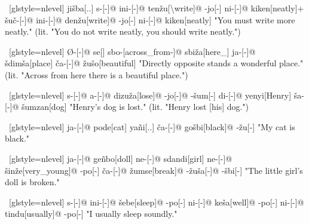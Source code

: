 \ex~[glstyle=nlevel]
\begingl
\glpreamble {}
\endpreamble
ji\v{s}ba[{\Spol}.{\Hg}.{\Erg}]
s-[{\Ind}-]@
ini-[{\Hab}-]@
ten\v{z}u[{\Neg}\textbackslash write]@
-jo[-\Hg]
ni-[{\Hab}-]@
kiken[neatly]+
\v{s}u\v{c}-[{\Deo}-]@
ini-[{\Hab}-]@
den\v{z}u[write]@
-jo[-\Hg]
ni-[{\Hab}-]@
kiken[neatly]
\glft "You must write more neatly." (lit. "You do not write neatly, you should write neatly.")
\endgl
\xe

\ex~[glstyle=nlevel]
\begingl
\glpreamble {}
\endpreamble
Ø-[{\Ind}-]@
se[{\Cop}]
sbo-[across\_from-]@
sbi\v{z}a[here\_{\Prox}]
ja-[{\Nom}-]@
\v{s}dim\v{s}a[place]
\v{c}a-[{\Nom}-]@
\v{z}u\v{s}o[beautiful]
\glft "Directly opposite stands a wonderful place." (lit. "Across from here there is a beautiful place.")
\endgl
\xe

\ex~[glstyle=nlevel]
\begingl
\glpreamble {}
\endpreamble
s-[{\Ind}-]@
a-[{\Prog}-]@
dizu\v{z}a[lose]@
-jo[-{\Hg}]@
-\v{s}um[-{\An}]
di-[{\Erg}-]@
yenyi[Henry]
\v{s}a-[{\Acc}-]@
\v{s}umzan[dog]
\glft "Henry's dog is lost." (lit. "Henry lost [his] dog.")
\endgl
\xe

\ex~[glstyle=nlevel]
\begingl
\glpreamble {}
\endpreamble
ja-[{\Nom}-]@
pode[cat]
yañi[{\Fex}.{\Hg}.{\Gen}]
\v{c}a-[{\Nom}-]@
go\v{s}bi[black]@
-\v{z}u[-{\An}]
\glft "My cat is black."
\endgl
\xe

\ex~[glstyle=nlevel]
\begingl
\glpreamble {}
\endpreamble
ja-[{\Nom}-]@
geñbo[doll]
ne-[{\Gen}-]@
sdandi[girl]
ne-[{\Gen}-]@
\v{s}in\v{z}e[very\_young]@
-po[-{\Hg}]
\v{c}a-[{\Nom}-]@
\v{z}umse[break]@
-\v{z}u\v{s}a[-{\Adjz}]@
-\v{s}bi[-{\Inan}]
\glft "The little girl's doll is broken."
\endgl
\xe

\ex~[glstyle=nlevel]
\begingl
\glpreamble {}
\endpreamble
s-[{\Ind}-]@
ini-[{\Hab}-]@
\v{s}ebe[sleep]@
-po[-{\Hg}]
ni-[{\Hab}-]@
ke\v{s}a[well]@
-po[-{\Hg}]
ni-[{\Hab}-]@
tindu[usually]@
-po[-{\Hg}]
\glft "I usually sleep soundly."
\endgl
\xe


\endgroup
\iffalse


\ex~[glstyle=nlevel]
\begingl
\glpreamble \SGwithRom{}
\endpreamble

\glft ""
\endgl
\xe


\fi
